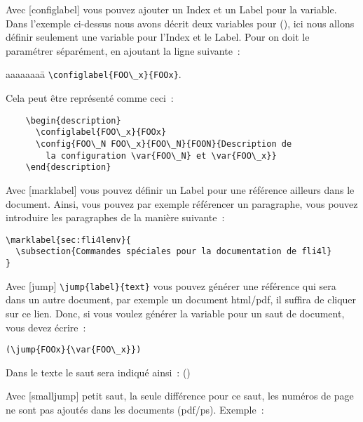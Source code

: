 \begin{description}
\item Avec [configlabel] vous pouvez ajouter un Index et un Label pour la
  variable. Dans l'exemple ci-dessus nous avons décrit deux variables pour
  (), ici nous allons définir seulement une variable pour l'Index
  et le Label. Pour  on doit le paramétrer séparément, en ajoutant
  la ligne suivante~:

  \begin{tabbing}
    aaaaaaaa\=\kill
    \>\verb*?\configlabel{FOO\_x}{FOOx}?.
  \end{tabbing}

  Cela peut être représenté comme ceci~:

\begin{verbatim}
    \begin{description}
      \configlabel{FOO\_x}{FOOx}
      \config{FOO\_N FOO\_x}{FOO\_N}{FOON}{Description de
        la configuration \var{FOO\_N} et \var{FOO\_x}}
    \end{description}
\end{verbatim}

\item Avec [marklabel] vous pouvez définir un Label pour une référence
  ailleurs dans le document. Ainsi, vous pouvez par exemple référencer un
  paragraphe, vous pouvez introduire les paragraphes de la manière suivante~:

\begin{verbatim}
\marklabel{sec:fli4lenv}{
  \subsection{Commandes spéciales pour la documentation de fli4l}
}
\end{verbatim}

\item Avec [jump] \verb*?\jump{label}{text}? vous pouvez générer une référence
  qui sera dans un autre document, par exemple un document html/pdf, il suffira
  de cliquer sur ce lien. Donc, si vous voulez générer la variable 
  pour un saut de document, vous devez écrire~:

\begin{verbatim}
(\jump{FOOx}{\var{FOO\_x}})
\end{verbatim}

Dans le texte le saut sera indiqué ainsi~: ()

\item Avec [smalljump] \frqq{}petit saut\frqq{}, la seule différence pour ce
  saut, les numéros de page ne sont pas ajoutés dans les documents (pdf/ps).
  Exemple~:


\end{description}
